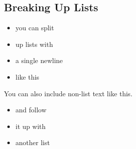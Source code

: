 \documentclass[11pt,letterpaper]{article}
\begin{document}
\begin{multicols*}{2}
\subsection*{Breaking Up Lists}
\begin{itemize}
    \item you can split
    \item up lists with
\end{itemize}
\vspace{0.1cm}
\begin{itemize}
    \item a single newline
    \item like this
\end{itemize}
You can also include non-list text like this.
\begin{itemize}
    \item and follow
    \item it up with
    \item another list
\end{itemize}


\end{multicols*}
\end{document}
